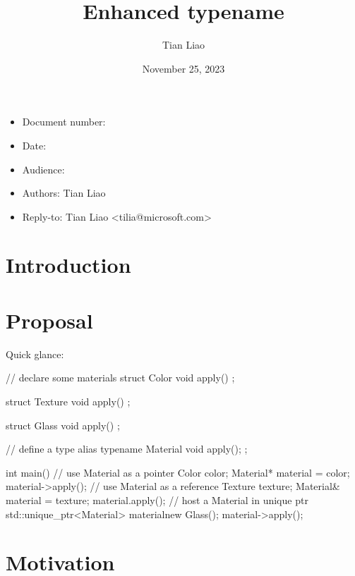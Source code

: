 \documentclass{article}
\title{Enhanced typename}
\author{Tian Liao}
\date{November 25, 2023}
\begin{document}
\maketitle
\vfill
\begin{itemize}[noitemsep]
  \item[] Document number:
  \item[] Date:
  \item[] Audience:
  \item[] Authors: Tian Liao
  \item[] Reply-to: Tian Liao \textless tilia@microsoft.com\textgreater
\end{itemize}

\newpage
{}

\section{Introduction}

\section{Proposal}
Quick glance:
\begin{codeblock}
// declare some materials
struct Color {
  void apply() {}
};

struct Texture {
  void apply() {}
};

struct Glass {
  void apply() {}
};

// define a type alias
typename Material {
  void apply();
};

int main() {
  {
    // use Material as a pointer
    Color color;
    Material* material = color;
    material->apply();
  }
  {
    // use Material as a reference
    Texture texture;
    Material& material = texture;
    material.apply();
  }
  {
    // host a Material in unique ptr
    std::unique_ptr<Material> material{new Glass()};
    material->apply();
  }
}
\end{codeblock}

\section{Motivation}
\end{document}

